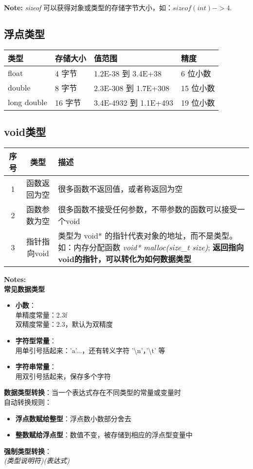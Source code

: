 \documentclass[UTF8]{ctexart}
\begin{document}
	\begin{framed}
		\textbf{Note:} \emph{sizeof} 可以获得对象或类型的存储字节大小，如：$sizeof(int) ->4$.
	\end{framed}

	\subsection{浮点类型}
	\begin{tabular*}{\linewidth}{l|l|l|l}
		\toprule
		类型 & 存储大小 & 值范围 & 精度\\
		\midrule
		float & 4 字节 & 1.2E-38 到 3.4E+38 & 6 位小数\\
		double & 8 字节 & 2.3E-308 到 1.7E+308 & 15 位小数\\
		long double & 16 字节 & 3.4E-4932 到 1.1E+493 & 19 位小数\\
		\bottomrule
	\end{tabular*}

	\subsection{void类型}
	\begin{tabular*}{\linewidth}{c|c|p{22em}}
		\toprule
		序号 & 类型 & 描述\\
		\midrule
		1 & 函数返回为空 & 很多函数不返回值，或者称返回为空\\
		2 & 函数参数为空 & 很多函数不接受任何参数，不带参数的函数可以接受一个void\\
		3 & 指针指向void & 类型为 void* 的指针代表对象的地址，而不是类型。如：内存分配函数 \textit{void* malloc(size\_t size)}; \textbf{返回指向void的指针，可以转化为如何数据类型}\\
		\bottomrule
	\end{tabular*}

	\begin{framed}
		\textbf{Notes:} \\\textbf{常见数据类型}\begin{itemize}
			\item \textbf{小数}：\\单精度常量：2.3f\\双精度常量：2.3，默认为双精度
			\item \textbf{字符型常量}：\\用单引号括起来：'a'...，还有转义字符 '\textbackslash n'，'\textbackslash t' 等
			\item \textbf{字符串常量}：\\ 用双引号括起来，保存多个字符
		\end{itemize}
		\textbf{数据类型转换}：当一个表达式存在不同类型的常量或变量时\\自动转换规则：\begin{itemize}
			\item \textbf{浮点数赋给整型}：浮点数小数部分舍去
			\item \textbf{整数赋给浮点型}：数值不变，被存储到相应的浮点型变量中
		\end{itemize}
		\textbf{强制类型转换}：\\ \emph{(类型说明符)(表达式)}
	\end{framed}
\end{document}

